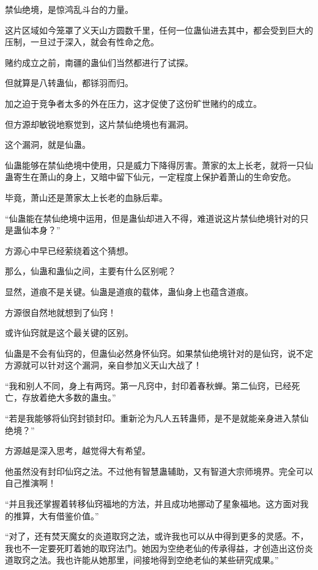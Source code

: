 
\begin{this_body}

禁仙绝境，是惊鸿乱斗台的力量。

这片区域如今笼罩了义天山方圆数千里，任何一位蛊仙进去其中，都会受到巨大的压制，一旦过于深入，就会有性命之危。

赌约成立之前，南疆的蛊仙们当然都进行了试探。

但就算是八转蛊仙，都铩羽而归。

加之迫于竞争者太多的外在压力，这才促使了这份旷世赌约的成立。

但方源却敏锐地察觉到，这片禁仙绝境也有漏洞。

这个漏洞，就是仙蛊。

仙蛊能够在禁仙绝境中使用，只是威力下降得厉害。萧家的太上长老，就将一只仙蛊寄生在萧山的身上，又暗中留下仙元，一定程度上保护着萧山的生命安危。

毕竟，萧山还是萧家太上长老的血脉后辈。

“仙蛊能在禁仙绝境中运用，但是蛊仙却进入不得，难道说这片禁仙绝境针对的只是蛊仙本身？”

方源心中早已经萦绕着这个猜想。

那么，仙蛊和蛊仙之间，主要有什么区别呢？

显然，道痕不是关键。仙蛊是道痕的载体，蛊仙身上也蕴含道痕。

方源很自然地就想到了仙窍！

或许仙窍就是这个最关键的区别。

仙蛊是不会有仙窍的，但蛊仙必然身怀仙窍。如果禁仙绝境针对的是仙窍，说不定方源就可以针对这个漏洞，亲自参加义天山大战了！

“我和别人不同，身上有两窍。第一凡窍中，封印着春秋蝉。第二仙窍，已经死亡，存放着绝大多数的蛊虫。”

“若是我能够将仙窍封锁封印。重新沦为凡人五转蛊师，是不是就能亲身进入禁仙绝境？”

方源越是深入思考，越觉得大有希望。

他虽然没有封印仙窍之法。不过他有智慧蛊辅助，又有智道大宗师境界。完全可以自己推演啊！

“并且我还掌握着转移仙窍福地的方法，并且成功地挪动了星象福地。这方面对我的推算，大有借鉴价值。”

“对了，还有焚天魔女的炎道取窍之法，或许我也可以从中得到更多的灵感。不，我也不一定要死盯着她的取窍法门。她因为空绝老仙的传承得益，才创造出这份炎道取窍之法。我也许能从她那里，间接地得到空绝老仙的某些研究成果。”


\end{this_body}
